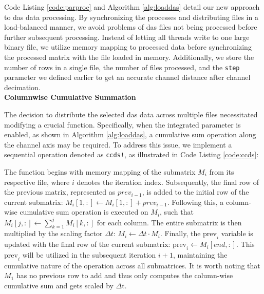 Code Listing \ref{code:parproc} and Algorithm \ref{alg:loaddas} detail our new approach to \acrshort{das} data processing. By synchronizing the processes and distributing files in a load-balanced manner, we avoid problems of \acrshort{das} files not being processed before further subsequent processing. Instead of letting all threads write to one large binary file, we utilize memory mapping \cite{mmap_article} to processed data before synchronizing the processed matrix with the file loaded in memory.
%
Additionally, we store the number of rows in a single file, the number of files processed, and the \texttt{step} parameter we defined earlier to get an accurate channel distance after channel decimation.\\
%  
%  

\clearpage
\textbf{Columnwise Cumulative Summation}

The decision to distribute the selected \acrshort{das} data across multiple files necessitated modifying a crucial function. Specifically, when the integrated parameter is enabled, as shown in Algorithm \ref{alg:loaddas}, a cumulative sum operation along the channel axis may be required. To address this issue, we implement a sequential operation denoted as \texttt{ccds!}, as illustrated in Code Listing \ref{code:ccds}:



The function begins with memory mapping of the submatrix $M_i$ from its respective file, where $i$ denotes the iteration index. Subsequently, the final row of the previous matrix, represented as $prev_{i-1}$, is added to the initial row of the current submatrix: $M_i[1,:] \leftarrow M_i[1,:] + prev_{i-1}$. Following this, a column-wise cumulative sum operation is executed on $M_i$, such that $M_i[j,:] \leftarrow \sum_{k=1}^j M_i[k,:]$ for each column. The entire submatrix is then multiplied by the scaling factor $\Delta t$: $M_i \leftarrow \Delta t \cdot M_i$. Finally, the $\text{prev}_i$ variable is updated with the final row of the current submatrix: $\text{prev}_i \leftarrow M_i[end,:]$. This $\text{prev}_i$ will be utilized in the subsequent iteration $i+1$, maintaining the cumulative nature of the operation across all submatrices. It is worth noting that $M_1$ has no previous row to add and thus only computes the column-wise cumulative sum and gets scaled by $\Delta$t.

